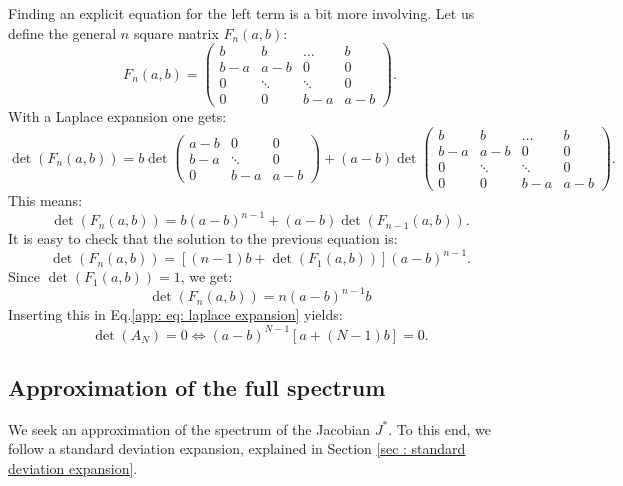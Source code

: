 \documentclass[12pt, titlepage, twoside, openright]{report}
\begin{document}
Finding an explicit equation for the left term is a bit more involving. Let us define the general $n$ square matrix $F_n(a,b)$:
\begin{equation}
F_n(a,b) = \begin{pmatrix}
b & b & \dots & b \\
b-a & a-b & 0 & 0 \\
0 & \ddots & \ddots & 0 \\
0 & 0 & b-a & a-b
\end{pmatrix}.
\end{equation}
With a Laplace expansion one gets:
\begin{equation}
\det\left(F_n(a,b)\right)= b
\det\begin{pmatrix}
a-b & 0 & 0 \\
b-a & \ddots & 0 \\
0 & b-a & a-b
\end{pmatrix}+(a-b)\det\begin{pmatrix}
b & b & \dots & b \\
b-a & a-b & 0 & 0 \\
0 & \ddots & \ddots & 0 \\
0 & 0 & b-a & a-b
\end{pmatrix}.
\end{equation}
This means:
\begin{equation}
\det(F_n(a,b))=b(a-b)^{n-1}+(a-b)\det(F_{n-1}(a,b)).
\end{equation}
It is easy to check that the solution to the previous equation is:
\begin{equation}
\det(F_n(a,b))=\left[(n-1)b+\det\left(F_1(a,b)\right)\right](a-b)^{n-1}.
\end{equation}
Since $\det\left(F_1(a,b)\right)=1$, we get:
\begin{equation}
\det\left(F_n(a,b)\right)=n(a-b)^{n-1}b
\end{equation}
Inserting this in Eq.\eqref{app: eq: laplace expansion} yields:
\begin{equation}
\boxed{
\det(A_N)=0 \iff (a-b)^{N-1}\left[a+(N-1)b\right]=0.
}\label{eq: formula special determinant}
\end{equation}


\subsection{Approximation of the full spectrum }\label{sec: approximate full spectrum}
We seek an approximation of the spectrum of the Jacobian $J^*$. To this end, we follow a standard deviation expansion, explained in Section \ref{sec : standard deviation expansion}.
\end{document}
